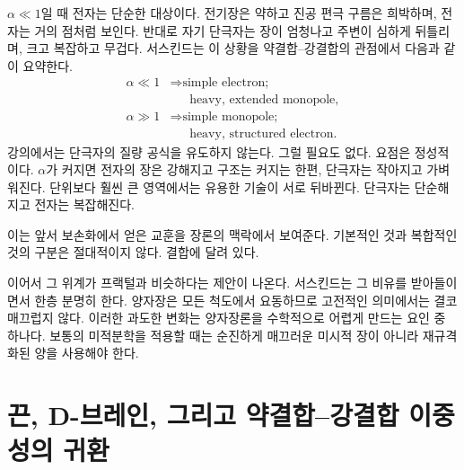 
\(\alpha\ll 1\)일 때 전자는 단순한 대상이다. 전기장은 약하고 진공 편극 구름은 희박하며, 전자는 거의 점처럼 보인다. 반대로 자기 단극자는 장이 엄청나고 주변이 심하게 뒤틀리며, 크고 복잡하고 무겁다. 서스킨드는 이 상황을 약결합--강결합의 관점에서 다음과 같이 요약한다.
\begin{equation}
\begin{aligned}
\alpha \ll 1
&\Rightarrow \text{simple electron;}\\
&\phantom{\Rightarrow{}}\text{heavy, extended monopole},\\
\alpha \gg 1
&\Rightarrow \text{simple monopole;}\\
&\phantom{\Rightarrow{}}\text{heavy, structured electron}.
\end{aligned}
\end{equation}
강의에서는 단극자의 질량 공식을 유도하지 않는다. 그럴 필요도 없다. 요점은 정성적이다. \(\alpha\)가 커지면 전자의 장은 강해지고 구조는 커지는 한편, 단극자는 작아지고 가벼워진다. 단위보다 훨씬 큰 영역에서는 유용한 기술이 서로 뒤바뀐다. 단극자는 단순해지고 전자는 복잡해진다.

이는 앞서 보손화에서 얻은 교훈을 장론의 맥락에서 보여준다. 기본적인 것과 복합적인 것의 구분은 절대적이지 않다. 결합에 달려 있다.

\begin{classroomqa}
\end{classroomqa}

이어서 그 위계가 프랙털과 비슷하다는 제안이 나온다. 서스킨드는 그 비유를 받아들이면서 한층 분명히 한다. 양자장은 모든 척도에서 요동하므로 고전적인 의미에서는 결코 매끄럽지 않다. 이러한 과도한 변화는 양자장론을 수학적으로 어렵게 만드는 요인 중 하나다. 보통의 미적분학을 적용할 때는 순진하게 매끄러운 미시적 장이 아니라 재규격화된 양을 사용해야 한다.

\section{끈, D-브레인, 그리고 약결합--강결합 이중성의 귀환}

